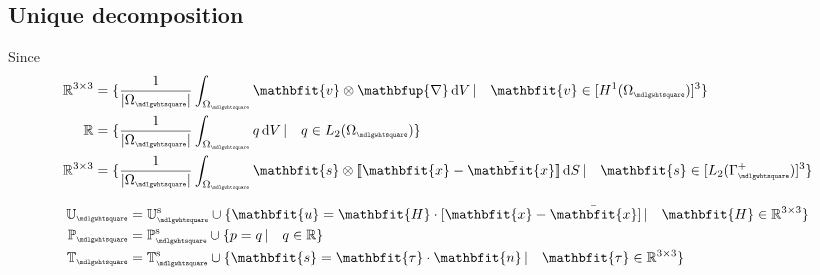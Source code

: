 \documentclass[12pt,a4paper]{article}
\renewcommand{\ta}[1]{\mathbfit{#1}}
\renewcommand{\ts}[1]{\mathbfit{#1}}
\renewcommand{\diff}{\mathbfup{\nabla}}
\renewcommand{\Box}{\mdlgwhtsquare}
\DeclarePairedDelimiter{\jmp}{[\![}{]\!]}
\newcommand{\volume}{|\Omega_\rve|}
\newcommand{\rve}{
  {\mathchoice
   {\mbox{\scalebox{0.67}{$\Box$}}}
   {\mbox{\scalebox{0.67}{$\Box$}}}
   {\mbox{\scalebox{0.5}{$\Box$}}}
   {\mbox{\scalebox{0.375}{$\Box$}}}
  }
}
\begin{document}


\newpage
\subsection{Unique decomposition}
\label{appendix:unique_decomposition}
Since 
\begin{align}
 \set R^{3\times3} &= \{ \frac{1}{\volume} \int_{\Omega_\rve} \ta v \outerp \diff \dif V \,|\quad \ta v \in[H^1(\Omega_\rve)]^3 \}
\\
 \set R &= \{ \frac{1}{\volume} \int_{\Omega_\rve} q \dif V \,|\quad q \in L_2(\Omega_\rve) \}
\\
 \set R^{3\times3} &= \{ \frac{1}{\volume} \int_{\Omega_\rve} \ta s \outerp \jmp{\ta x - \bar{\ta x}} \dif S \,|\quad \ta s \in [L_2(\Gamma_\rve^+)]^3 \}
\end{align}


\begin{align}
\set{U}_\rve &= \set{U}_\rve^\fluct \cup \{ \ta u = \ts H \cdot [\ta x - \bar{\ta x}] \,|\quad \ts H \in \set{R}^{3\times 3}\}
\\
\set{P}_\rve &= \set{P}_\rve^\fluct \cup \{ p = q \,|\quad q\in \set{R}\}
\\
\set{T}_\rve &= \set{T}_\rve^\fluct \cup \{ \ta s = \ts \tau \cdot \ta n \,|\quad \ts\tau \in \set{R}^{3\times 3}\}
\end{align}
\end{document}
